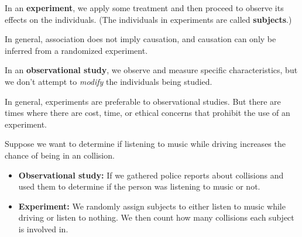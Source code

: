 \documentclass{beamer}
\begin{document}
\begin{frame}
\begin{definition}
In an \textbf{experiment}, we apply some treatment and then proceed to observe its effects on the individuals. (The individuals in experiments are called \textbf{subjects}.)
\end{definition}\pause

\begin{note}
In general, association does not imply causation, and causation can only be inferred from a randomized experiment.
\end{note}\pause

\begin{definition}
In an \textbf{observational study}, we observe and measure specific characteristics, but we don't attempt to \emph{modify} the individuals being studied.
\end{definition}\pause

\begin{note}
In general, experiments are preferable to observational studies. But there are times where there are cost, time, or ethical concerns that prohibit the use of an experiment.
\end{note}
\end{frame}

\begin{frame}
\begin{example}
Suppose we want to determine if listening to music while driving increases the chance of being in an collision.\pause
\begin{itemize}
\item \textbf{Observational study:} If we gathered police reports about collisions and used them to determine if the person was listening to music or not.\pause
\item \textbf{Experiment:} We randomly assign subjects to either listen to music while driving or listen to nothing. We then count how many collisions each subject is involved in.\pause
\end{itemize}
\pause
{}
\end{example}
\end{frame}
\end{document}
